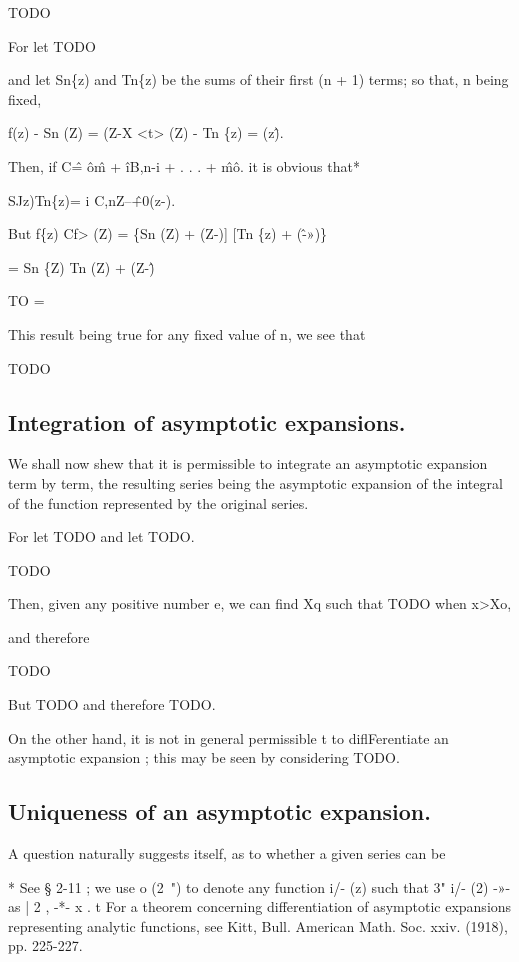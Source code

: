 TODO

For let TODO

% 
% 
and let Sn\{z) and Tn\{z) be the sums of their first (n + 1) terms; so that,
n being fixed,

f(z) - Sn (Z) = (Z-X <t> (Z) - Tn \{z) = (z\^).

Then, if C\^ = \^o\^m + \^iB,n-i + . . . + \^m\^o. it is obvious that*

SJz)Tn\{z)= i C,nZ--\^+0(z-).

But f\{z) Cf> (Z) = \{Sn (Z) + (Z-)] [Tn \{z) + (\^-»)\}

= Sn \{Z) Tn (Z) + (Z-\^)

TO =

This result being true for any fixed value of n, we see that

TODO

\subsection{Integration of asymptotic expansions.}

We shall now shew that it is permissible to integrate an asymptotic
expansion term by term, the resulting series being the asymptotic
expansion of the integral of the function represented by the original
series.

For let TODO and let TODO.

TODO

Then, given any positive number e, we can find Xq such that
TODO when x>Xo,



and therefore

TODO

But TODO
and therefore TODO.

On the other hand, it is not in general permissible t to
diflFerentiate an asymptotic expansion ; this may be seen by
considering TODO.

\subsection{Uniqueness of an asymptotic expansion.}

A question naturally suggests itself, as to whether a given series can be

* See § 2-11 ; we use o (2~") to denote any function i/- (z) such that 3" i/- (2) -»- as | 2 , -*- x .
t For a theorem concerning differentiation of asymptotic expansions representing analytic
functions, see Kitt, Bull. American Math. Soc. xxiv. (1918), pp. 225-227.


